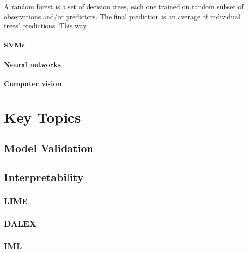 \documentclass[
]{book}
\begin{document}
A random forest is a set of decision trees, each one trained on random subset
of observations and/or predictors. The final prediction is an average of individual
trees' predictions. This way

\hypertarget{svms}{%
\paragraph{SVMs}\label{svms}}

\hypertarget{neural-networks}{%
\paragraph{Neural networks}\label{neural-networks}}

\hypertarget{computer-vision}{%
\paragraph{Computer vision}\label{computer-vision}}

\hypertarget{key-topics}{%
\section{Key Topics}\label{key-topics}}

\hypertarget{model-validation}{%
\subsection{Model Validation}\label{model-validation}}

\hypertarget{interpretability}{%
\subsection{Interpretability}\label{interpretability}}

\hypertarget{lime}{%
\subsubsection{LIME}\label{lime}}

\hypertarget{dalex}{%
\subsubsection{DALEX}\label{dalex}}

\hypertarget{iml}{%
\subsubsection{IML}\label{iml}}
\end{document}
